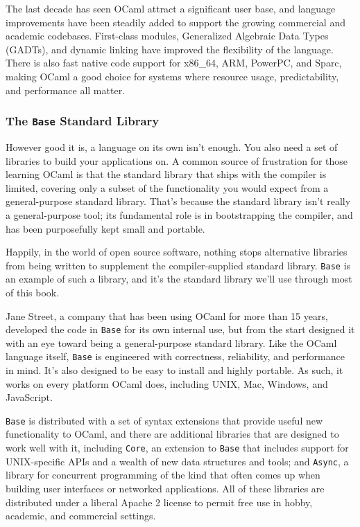 The last decade has seen OCaml attract a significant user base, and
language improvements have been steadily added to support the growing
commercial and academic {codebases}. First-class modules, Generalized
Algebraic Data Types (GADTs), and dynamic linking have improved the
flexibility of the language. There is also fast native code support for
x86\_64, ARM, PowerPC, and Sparc, making OCaml a good choice for systems
where resource usage, predictability, and performance all matter.

\hypertarget{the-core-standard-library}{%
\subsubsection{\texorpdfstring{The \texttt{Base} Standard
Library}{The Base Standard Library}}\label{the-core-standard-library}}

However good it is, a language on its own isn't enough. You also need a
set of libraries to build your applications on. A common source of
frustration for those learning OCaml is that the standard library that
ships with the compiler is limited, covering only a subset of the
functionality you would expect from a general-purpose standard library.
That's because the standard library isn't really a general-purpose tool;
its fundamental role is in bootstrapping the compiler, and has been
purposefully kept small and portable.

Happily, in the world of open source software, nothing stops alternative
libraries from being written to supplement the compiler-supplied
standard library. \passthrough{\lstinline!Base!} is an example of such a
library, and it's the standard library we'll use through most of this
book. 

Jane Street, a company that has been using OCaml for more than 15 years,
developed the code in \passthrough{\lstinline!Base!} for its own
internal use, but from the start designed it with an eye toward being a
general-purpose standard library. Like the OCaml language itself,
\passthrough{\lstinline!Base!} is engineered with correctness,
reliability, and performance in mind. It's also designed to be easy to
install and highly portable. As such, it works on every platform OCaml
does, including UNIX, Mac, Windows, and JavaScript.

\passthrough{\lstinline!Base!} is distributed with a set of syntax
extensions that provide useful new functionality to OCaml, and there are
additional libraries that are designed to work well with it, including
\passthrough{\lstinline!Core!}, an extension to
\passthrough{\lstinline!Base!} that includes support for UNIX-specific
APIs and a wealth of new data structures and tools; and
\passthrough{\lstinline!Async!}, a library for concurrent programming of
the kind that often comes up when building user interfaces or networked
applications. All of these libraries are distributed under a liberal
Apache 2 license to permit free use in hobby, academic, and commercial
settings.

